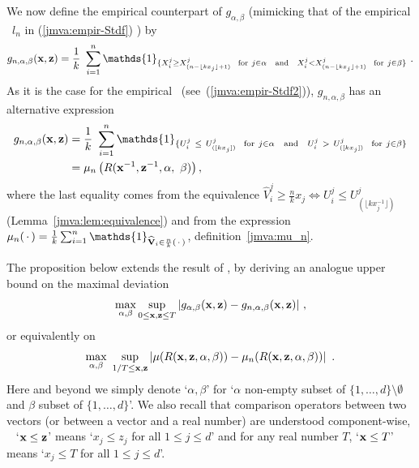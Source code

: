We now define the empirical counterpart of $g_{\alpha, \beta}$
(mimicking that of the empirical \stdf~$l_n$ in (\ref{jmva:empir-Stdf}) ) by
\begin{align}
\label{jmva:def:gn}
g_{n, \alpha, \beta}(\mb x, \mb z) = \frac{1}{k}~\sum_{i=1}^{n}
\mathds{1}_{\{ X_i^j \ge X^j_{(n-\lfloor kx_j \rfloor+1)}  ~~\text{for}~
  j \in \alpha \text{~~~and~~~} X_i^j < X^j_{(n-\lfloor
    kx_j\rfloor+1)} ~~\text{for}~ j \in\beta \}}~.
\end{align}
As it is the case for the empirical \stdf~(see~(\ref{jmva:empir-Stdf2})), $g_{n,\alpha,\beta}$ has an alternative expression
\begin{align}\label{jmva:eq:gn2}
  \nonumber g_{n, \alpha, \beta}(\mb x, \mb z)&=\frac{1}{k} ~\sum_{i=1}^{n}
  \mathds{1}_{\{ U_i^j ~\le~ U^j_{([kx_j])} ~~\text{for}~ j \in \alpha
    \text{~~~and~~~} U_i^j ~>~U^j_{([kx_j])} ~~\text{for}~ j \in\beta \}}\\
  &= \mu_n \left( R(\mb x^{-1}, \mb z^{-1}, \alpha,~\beta)\right),
\end{align}
where the last equality comes from the equivalence $\widehat V_i^j \ge \frac{n}{k} x_j \Leftrightarrow U_i^j \le U_{(\lfloor kx_j^{-1}\rfloor)}^j$ (Lemma~\ref{jmva:lem:equivalence}) and from the expression $\mu_n(\point) = \frac{1}{k}\sum_{i=1}^n \mathds{1}_{\mb{\widehat{V}}_i \in \frac{n}{k} (\point)}$, definition~\eqref{jmva:mu_n}.

\noindent
The proposition below extends the result of \cite{COLT15}, by deriving an analogue upper bound on the maximal deviation 
$$%
\max_{\alpha,\beta}\sup_{ 0 \le \mb x, \mb z \le T} |g_{\alpha, \beta}(\mb x, \mb z) - g_{n, \alpha, \beta}(\mb x, \mb z)|~,$$ 
or equivalently on
$$\max_{\alpha, \beta}~ \sup_{1/T \le \mathbf x, \mathbf z } \left|\mu ( R(\mathbf x, \mathbf z, \alpha, \beta)) - \mu_n (R(\mathbf x, \mathbf z, \alpha, \beta) )\right| ~.$$
Here and beyond %
we simply denote `$\alpha,\beta$'  for `$\alpha$ non-empty subset of $\{1,\ldots,d\}\setminus \emptyset$ and $\beta$ subset of
$\{1,\ldots,d\}$'. We also recall that comparison operators between two vectors (or
between a vector and a real number) are understood component-wise, \ie~ `$\mathbf x \le \mathbf z$' means `$x_j \le z_j$ for all $1\le j\le d$' and  for any real number $T$,  `$\mathbf x\le T$' means `$x_j \le T$ for all $1\le j\le d$'. 

